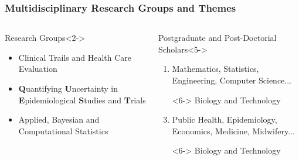 \documentclass[a4]{beamer}
\begin{document}
\begin{frame}
\frametitle{Multidisciplinary Research Groups and Themes}
  \begin{columns}[t]
    \begin{exampleblock}{Research Groups}<2->
      \begin{itemize}
          \item Clinical Trails and Health Care Evaluation
          \item<3-> \textbf{Q}uantifying \textbf{U}ncertainty in \textbf{E}pidemiological \textbf{S}tudies and \textbf{T}rials
          \item<4-> Applied, Bayesian and Computational Statistics
          \item[]
      \end{itemize}
    \end{exampleblock}
    \begin{exampleblock}{Postgraduate and Post-Doctorial Scholars}<5->
     \begin{enumerate}
       \item<5-> Mathematics, Statistics, Engineering, Computer Science...
       \item[]<6-> \alert{Biology and Technology}
       \item<5-> Public Health, Epidemiology, Economics, Medicine, Midwifery...
       \item[]<6-> \alert{Biology and Technology}
       \item[]
     \end{enumerate}
    \end{exampleblock}
  \end{columns}
\end{frame}
\end{document}
